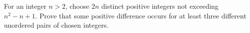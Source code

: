 For an integer $n>2$, choose $2n$ distinct positive integers not exceeding $n^2-n+1$. Prove that some positive difference occurs for at least three different unordered pairs of chosen integers.
